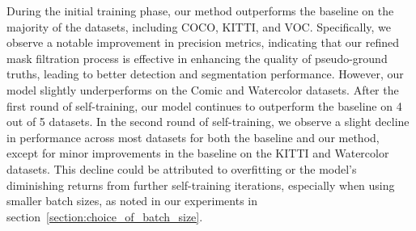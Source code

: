 During the initial training phase, our method outperforms the baseline on the majority of the datasets, including COCO, KITTI, and VOC. Specifically, we observe a notable improvement in precision metrics, indicating that our refined mask filtration process is effective in enhancing the quality of pseudo-ground truths, leading to better detection and segmentation performance. However, our model slightly underperforms on the Comic and Watercolor datasets. After the first round of self-training, our model continues to outperform the baseline on 4 out of 5 datasets. In the second round of self-training, we observe a slight decline in performance across most datasets for both the baseline and our method, except for minor improvements in the baseline on the KITTI and Watercolor datasets. This decline could be attributed to overfitting or the model’s diminishing returns from further self-training iterations, especially when using smaller batch sizes, as noted in our experiments in section~\ref{section:choice_of_batch_size}.

